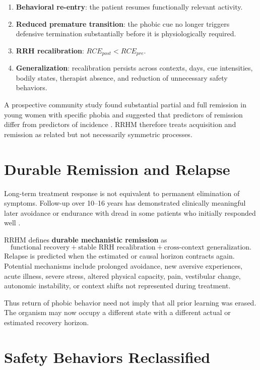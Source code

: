 \documentclass[11pt]{article}
\begin{document}
\begin{enumerate}[label=\arabic*.]
\item \textbf{Behavioral re-entry}: the patient resumes functionally relevant activity.
\item \textbf{Reduced premature transition}: the phobic cue no longer triggers defensive termination substantially before it is physiologically required.
\item \textbf{RRH recalibration}: $RCE_{post}<RCE_{pre}$.
\item \textbf{Generalization}: recalibration persists across contexts, days, cue intensities, bodily states, therapist absence, and reduction of unnecessary safety behaviors.
\end{enumerate}

A prospective community study found substantial partial and full remission in young women with specific phobia and suggested that predictors of remission differ from predictors of incidence \cite{trumpf2009remission}. RRHM therefore treats acquisition and remission as related but not necessarily symmetric processes.

\section{Durable Remission and Relapse}

Long-term treatment response is not equivalent to permanent elimination of symptoms. Follow-up over 10--16 years has demonstrated clinically meaningful later avoidance or endurance with dread in some patients who initially responded well \cite{ost2000longterm}.

RRHM defines \textbf{durable mechanistic remission} as
\[
\text{functional recovery}+\text{stable RRH recalibration}+\text{cross-context generalization}.
\]
Relapse is predicted when the estimated or causal horizon contracts again. Potential mechanisms include prolonged avoidance, new aversive experiences, acute illness, severe stress, altered physical capacity, pain, vestibular change, autonomic instability, or context shifts not represented during treatment.

Thus return of phobic behavior need not imply that all prior learning was erased. The organism may now occupy a different state with a different actual or estimated recovery horizon.

\section{Safety Behaviors Reclassified}
\end{document}
